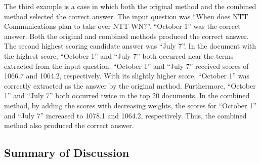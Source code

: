 The third example is a case in which 
both the original method and the combined method selected the correct answer. 
The input question was ``When does NTT Communications plan to take over NTT-WN?''. 
``October 1'' was the correct answer. 
Both the original and combined methods produced the correct answer. 
The second highest scoring candidate answer was ``July 7''. 
In the document with the highest score, 
``October 1'' and ``July 7'' both occurred near the terms extracted from the input question. 
``October 1'' and ``July 7'' received scores of 1066.7 and 1064.2, respectively. 
With its slightly higher score, 
``October 1'' was correctly extracted as the answer by the original method. 
Furthermore, ``October 1'' and 
``July 7'' both occurred twice in the top 20 documents. 
In the combined method, 
by adding the scores with decreasing weights, 
the scores for ``October 1'' and ``July 7'' increased to 1078.1 and 1064.2, respectively. 
Thus, the combined method also produced the correct answer. 

\subsection{Summary of Discussion}

